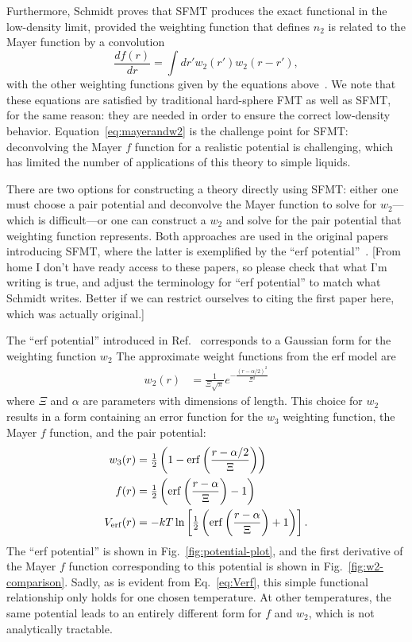\documentclass[letterpaper,twocolumn,amsmath,amssymb,prb]{revtex4-1}
\newcommand{\red}[1]{{\color{red} #1}}
\newcommand{\fixme}[1]{\red{[#1]}}
\begin{document}
Furthermore, Schmidt proves that SFMT produces the exact functional in
the low-density limit, provided the weighting function that defines
$n_2$ is related to the Mayer function by a convolution
\begin{equation}\label{eq:mayerandw2}
  \frac{d f(r)}{dr} = \int dr' w_2(r') w_2 (r-r'),
\end{equation}
with the other weighting functions given by the equations
above~\cite{schmidt2000fluid}.  We note that these equations are
satisfied by traditional hard-sphere FMT as well as SFMT, for the same
reason: they are needed in order to ensure the correct low-density
behavior.  Equation~\ref{eq:mayerandw2} is the challenge point for
SFMT: deconvolving the Mayer $f$ function for a realistic potential is
challenging, which has limited the number of applications of this
theory to simple liquids.

There are two options for constructing a theory directly using SFMT:
either one must choose a pair potential and deconvolve the Mayer
function to solve for $w_2$---which is difficult---or one can
construct a $w_2$ and solve for the pair potential that weighting
function represents.  Both approaches are used in the original papers
introducing SFMT, where the latter is exemplified by the ``erf
potential''~\cite{schmidt1999density, schmidt2000fluid}. \fixme{From
  home I don't have ready access to these papers, so please check that
  what I'm writing is true, and adjust the terminology for ``erf
  potential'' to match what Schmidt writes.  Better if we can restrict
  ourselves to citing the first paper here, which was actually
  original.}

The ``erf potential'' introduced in Ref.~
corresponds to a Gaussian form for the weighting function $w_2$
The approximate weight functions from the erf model are
\begin{align}
  w_2(r) &= \frac{1}{\Xi \sqrt{\pi}} e^{-\frac{(r-\alpha/2)^2}{\Xi^2}}
  \label{eq:gaussianw2}
\end{align}
where $\Xi$ and $\alpha$ are parameters with dimensions of length.
This choice for $w_2$ results in a form containing an error function
for the $w_3$ weighting function, the Mayer $f$ function, and the pair
potential:
\begin{align}
  w_3(r) &= \tfrac12 \left( 1 - \mathrm{erf}\left(\frac{r-\alpha/2}{\Xi}\right) \right) \\
  f(r) &= \tfrac12 \left( \mathrm{erf}\left( \frac{r - \alpha}{\Xi} \right) - 1 \right)
  \label{eq:mayer-approx} \\
  V_{\mathrm{erf}}(r) &= -kT\ln\left[\tfrac12 \left( \mathrm{erf}\left( \frac{r -
    \alpha}{\Xi} \right) + 1 \right) \right].\label{eq:Verf}
\end{align}
The ``erf potential'' is shown in Fig.~\ref{fig:potential-plot}, and
the first derivative of the Mayer $f$ function corresponding to this
potential is shown in Fig.~\ref{fig:w2-comparison}.  Sadly, as is
evident from Eq.~\ref{eq:Verf}, this simple functional relationship
only holds for one chosen temperature.  At other temperatures, the
same potential leads to an entirely different form for $f$ and $w_2$,
which is not analytically tractable.
\end{document}
